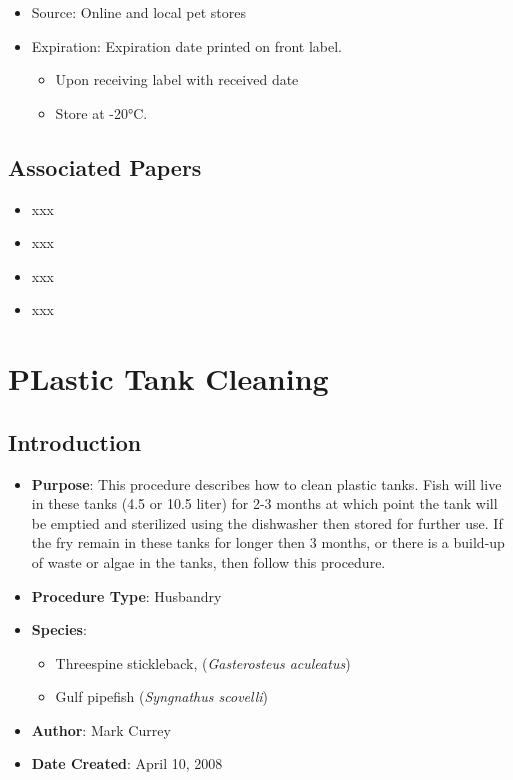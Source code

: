 \documentclass[
  letterpaper,
  DIV=11,
  numbers=noendperiod]{scrreprt}
\providecommand{\tightlist}{%
  \setlength{\itemsep}{0pt}\setlength{\parskip}{0pt}}\usepackage{longtable,booktabs,array}
\begin{document}
\begin{enumerate}
  \begin{itemize}
  \tightlist
  \item
    Source: Online and local pet stores
  \item
    Expiration: Expiration date printed on front label.

    \begin{itemize}
    \tightlist
    \item
      Upon receiving label with received date
    \item
      Store at -20°C.
    \end{itemize}
  \end{itemize}
\end{enumerate}

\hypertarget{associated-papers-20}{%
\section{Associated Papers}\label{associated-papers-20}}

\begin{itemize}
\tightlist
\item
  xxx
\item
  xxx
\item
  xxx
\item
  xxx
\end{itemize}

\hypertarget{sec-husbandry-plastic_tank_cleaning}{%
\chapter{PLastic Tank
Cleaning}\label{sec-husbandry-plastic_tank_cleaning}}

\hypertarget{introduction-33}{%
\section{Introduction}\label{introduction-33}}

\begin{itemize}
\tightlist
\item
  \textbf{Purpose}: This procedure describes how to clean plastic tanks.
  Fish will live in these tanks (4.5 or 10.5 liter) for 2-3 months at
  which point the tank will be emptied and sterilized using the
  dishwasher then stored for further use. If the fry remain in these
  tanks for longer then 3 months, or there is a build-up of waste or
  algae in the tanks, then follow this procedure.
\item
  \textbf{Procedure Type}: Husbandry
\item
  \textbf{Species}:

  \begin{itemize}
  \tightlist
  \item
    Threespine stickleback, (\emph{Gasterosteus aculeatus})
  \item
    Gulf pipefish (\emph{Syngnathus scovelli})
  \end{itemize}
\item
  \textbf{Author}: Mark Currey
\item
  \textbf{Date Created}: April 10, 2008
\end{itemize}
\end{document}
